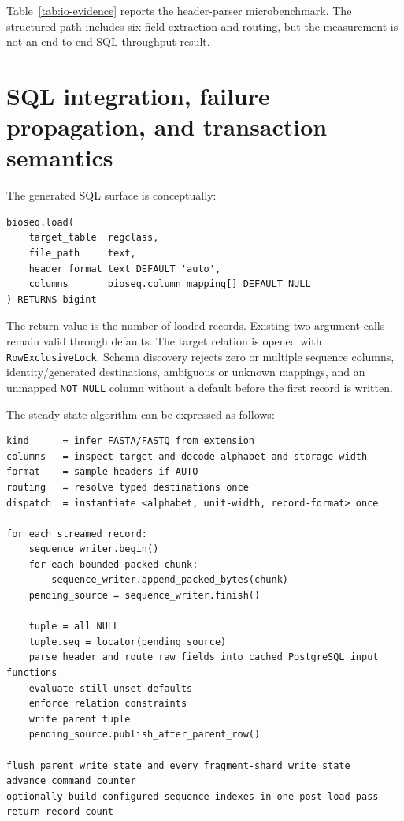 Table~\ref{tab:io-evidence} reports the header-parser microbenchmark. The
structured path includes six-field extraction and routing, but the measurement
is not an end-to-end SQL throughput result.

\section{SQL integration, failure propagation, and transaction semantics}
\label{sec:io-sql}

The generated SQL surface is conceptually:

\begin{verbatim}
bioseq.load(
    target_table  regclass,
    file_path     text,
    header_format text DEFAULT 'auto',
    columns       bioseq.column_mapping[] DEFAULT NULL
) RETURNS bigint
\end{verbatim}

The return value is the number of loaded records.  Existing two-argument calls
remain valid through defaults.  The target relation is opened with
\texttt{RowExclusiveLock}.  Schema discovery rejects zero or multiple sequence
columns, identity/generated destinations, ambiguous or unknown mappings, and
an unmapped \texttt{NOT NULL} column without a default before the first record
is written.

The steady-state algorithm can be expressed as follows:

\begin{verbatim}
kind      = infer FASTA/FASTQ from extension
columns   = inspect target and decode alphabet and storage width
format    = sample headers if AUTO
routing   = resolve typed destinations once
dispatch  = instantiate <alphabet, unit-width, record-format> once

for each streamed record:
    sequence_writer.begin()
    for each bounded packed chunk:
        sequence_writer.append_packed_bytes(chunk)
    pending_source = sequence_writer.finish()

    tuple = all NULL
    tuple.seq = locator(pending_source)
    parse header and route raw fields into cached PostgreSQL input functions
    evaluate still-unset defaults
    enforce relation constraints
    write parent tuple
    pending_source.publish_after_parent_row()

flush parent write state and every fragment-shard write state
advance command counter
optionally build configured sequence indexes in one post-load pass
return record count
\end{verbatim}

